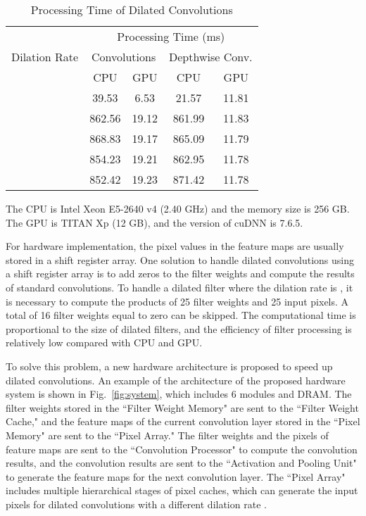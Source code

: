 \documentclass[10pt,twocolumn,letterpaper]{article}
\begin{document}
\begin{table}
\caption{Processing Time of Dilated Convolutions}
\begin{center}
\begin{tabular}{l|cc|cc}
\hline
\multirow{3}{*}{Dilation Rate} 
               & \multicolumn{4}{c}{Processing Time (ms)}\\
\cline{2-5}
               & \multicolumn{2}{c|}{Convolutions} & \multicolumn{2}{c}{Depthwise Conv.}\\ 
\cline{2-5}               
               & {CPU}  & GPU      & {CPU}  & GPU\\
              
\hline
 & 39.53  & 6.53  & 21.57  & 11.81\\
 & 862.56 & 19.12 & 861.99 & 11.83\\
 & 868.83 & 19.17 & 865.09 & 11.79\\
 & 854.23 & 19.21 & 862.95 & 11.78\\
 & 852.42 & 19.23 & 871.42 & 11.78\\
\hline
\end{tabular}
\end{center}
{\footnotesize
The CPU is Intel Xeon E5-2640 v4 (2.40 GHz) and the memory size is 256 GB.\\
The GPU is TITAN Xp (12 GB), and the version of cuDNN is 7.6.5.\\
}
\label{tab:time}
\end{table}

For hardware implementation, the pixel values in the feature maps are usually stored in a shift register array. One solution to handle dilated convolutions using a shift register array is to add zeros to the filter weights and compute the results of standard convolutions. To handle a dilated  filter where the dilation rate  is , it is necessary to compute the products of 25 filter weights and 25 input pixels. A total of 16 filter weights equal to zero can be skipped. The computational time is proportional to the size of dilated filters, and the efficiency of filter processing is relatively low compared with CPU and GPU.

To solve this problem, a new hardware architecture is proposed to speed up dilated convolutions. An example of the architecture of the proposed hardware system is shown in Fig.~\ref{fig:system}, which includes 6 modules and DRAM. The filter weights stored in the ``Filter Weight Memory" are sent to the ``Filter Weight Cache," and the feature maps of the current convolution layer stored in the ``Pixel Memory" are sent to the ``Pixel Array." The filter weights and the pixels of feature maps are sent to the ``Convolution Processor" to compute the convolution results, and the convolution results are sent to the ``Activation and Pooling Unit" to generate the feature maps for the next convolution layer. The ``Pixel Array" includes multiple hierarchical stages of pixel caches, which can generate the input pixels for dilated convolutions with a different dilation rate .
\end{document}
